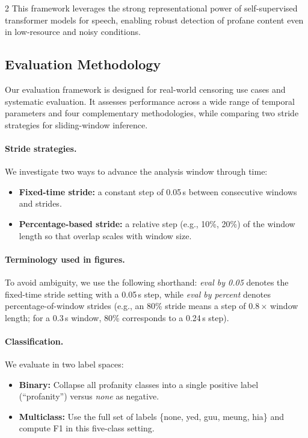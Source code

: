 \documentclass[11pt,a4paper]{article}
\begin{document}
\begin{multicols}{2}
This framework leverages the strong representational power of self-supervised transformer models for speech, enabling robust detection of profane content even in low-resource and noisy conditions.

\subsection{Evaluation Methodology}
Our evaluation framework is designed for real-world censoring use cases and systematic evaluation. It assesses performance across a wide range of temporal parameters and four complementary methodologies, while comparing two stride strategies for sliding-window inference.

\paragraph{Stride strategies.} We investigate two ways to advance the analysis window through time:
\begin{itemize}
  \item \textbf{Fixed-time stride:} a constant step of 0.05\,s between consecutive windows and strides.
  \item \textbf{Percentage-based stride:} a relative step (e.g., 10\%, 20\%) of the window length so that overlap scales with window size.
\end{itemize}

\paragraph{Terminology used in figures.} To avoid ambiguity, we use the following shorthand: \emph{eval by 0.05} denotes the fixed-time stride setting with a 0.05\,s step, while \emph{eval by percent} denotes percentage-of-window strides (e.g., an 80\% stride means a step of 0.8\,$\times$ window length; for a 0.3\,s window, 80\% corresponds to a 0.24\,s step).

\paragraph{Classification.} We evaluate in two label spaces:
\begin{itemize}
  \item \textbf{Binary:} Collapse all profanity classes into a single positive label (``profanity'') versus \emph{none} as negative.
  \item \textbf{Multiclass:} Use the full set of labels \{none, yed, guu, meung, hia\} and compute F1 in this five-class setting.
\end{itemize}


\end{multicols}
\end{document}
